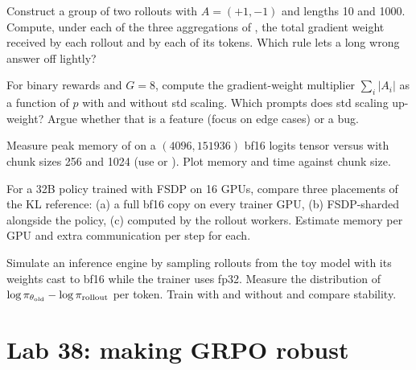 \begin{exercise}
Construct a group of two rollouts with $A=(+1,-1)$ and lengths 10 and 1000. Compute, under
each of the three aggregations of , the total gradient weight
received by each rollout and by each of its tokens. Which rule lets a long wrong answer off
lightly?
\end{exercise}

\begin{exercise}
For binary rewards and $G=8$, compute the gradient-weight multiplier
$\sum_i|A_i|$ as a function of $p$ with and without std scaling. Which prompts does std
scaling up-weight? Argue whether that is a feature (focus on edge cases) or a bug.
\end{exercise}

\begin{exercise}
Measure peak memory of  on a $(4096, \num{151936})$ bf16 logits tensor
versus  with chunk sizes 256 and 1024 (use
\allowbreak{} or ). Plot memory and time against
chunk size.
\end{exercise}

\begin{exercise}
For a 32B policy trained with FSDP on 16 GPUs, compare three placements of the KL
reference: (a) a full bf16 copy on every trainer GPU, (b) FSDP-sharded alongside the policy,
(c) computed by the rollout workers. Estimate memory per GPU and extra communication per step
for each.
\end{exercise}

\begin{exercise}
Simulate an inference engine by sampling rollouts from the toy model with its weights cast to
bf16 while the trainer uses fp32. Measure the distribution of $\log\pi_{\theta_{\text{old}}}-\log\pi_{\text{rollout}}$
per token. Train with and without  and compare stability.
\end{exercise}

\section{Lab 38: making GRPO robust}\label{sec:grpo2:lab}

